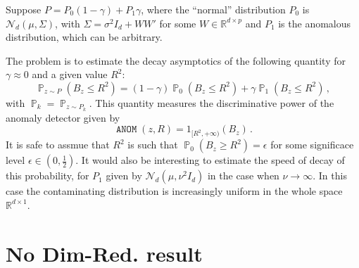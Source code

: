 \documentclass[a4paper,14pt]{article}
\newcommand{\pr}{\mathop{\mathbb{P}}\nolimits}
\newcommand{\Real}{\mathbb{R}}
\begin{document}
Suppose $P = P_0 (1-\gamma) + P_1 \gamma$, where the ``normal'' distribution $P_0$
is $\mathcal{N}_d(\mu, \Sigma)$, with $\Sigma = \sigma^2 I_d + WW'$ for some
$W\in \Real^{d\times p}$ and $P_1$ is the anomalous distribution, which can
be arbitrary.

The problem is to estimate the decay asymptotics of the following quantity for
$\gamma \approx 0$ and a given value $R^2$:
$$ \pr_{z\sim P}(B_z \leq R^2)
	= (1-\gamma) \pr_0(B_z \leq R^2) + \gamma \pr_1(B_z \leq R^2)
	\,,$$
with $\pr_k = \pr_{z\sim P_k}$. This quantity measures the discriminative power
of the anomaly detector given by
$$ \mathop{\mathtt{ANOM}}(z, R) = 1_{[R^2, +\infty)}(B_z) \,.$$
It is safe to assmue that $R^2$ is such that $\pr_0(B_z \geq R^2) = \epsilon$ for
some significace level $\epsilon\in(0,\tfrac{1}{2})$. It would also be interesting
to estimate the speed of decay of this probability, for $P_1$ given by
$\mathcal{N}_d(\mu, \nu^2 I_d)$ in the case when $\nu\to \infty$. In this case
the contaminating distribution is increasingly uniform in the whole space
$\Real^{d\times 1}$.

\clearpage

\section{No Dim-Red. result} %
\label{sec:no_dim_red_result}
\end{document}
